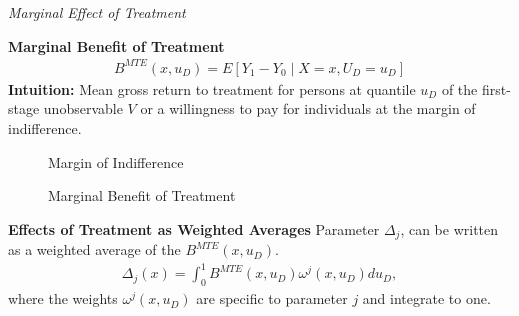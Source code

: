 \begin{frame}\begin{center}
		\LARGE\textit{Marginal Effect of Treatment}
\end{center}\end{frame}
\begin{frame}\textbf{Marginal Benefit of Treatment}
	\begin{align*}
		B^{MTE}(x, u_D) = E [Y_1 - Y_0 \mid X = x,  U_D = u_D]
	\end{align*}
	\textbf{Intuition:} Mean gross return to treatment for persons at
	quantile \(u_D\) of the first-stage unobservable \(V\) or a willingness to pay for individuals at the margin of indifference.
\end{frame}
\begin{frame}
	\begin{figure}\caption{Margin of Indifference}
	\end{figure}
\end{frame}
\begin{frame}
	\begin{figure}\caption{Marginal Benefit of Treatment}
	\end{figure}
\end{frame}
\begin{frame}
	\textbf{Effects of Treatment as Weighted Averages}
	Parameter \(\Delta_j\), can be written as a weighted average of the
	\(B^{MTE}(x, u_D)\).
	\begin{align*}
		\Delta_j(x) = \int_0^1 B^{MTE}(x, u_D) \omega^j(x, u_D) du_D,
	\end{align*}
	where the weights \(\omega^j(x, u_D)\) are specific to parameter \(j\)
	and integrate to one.
\end{frame}
